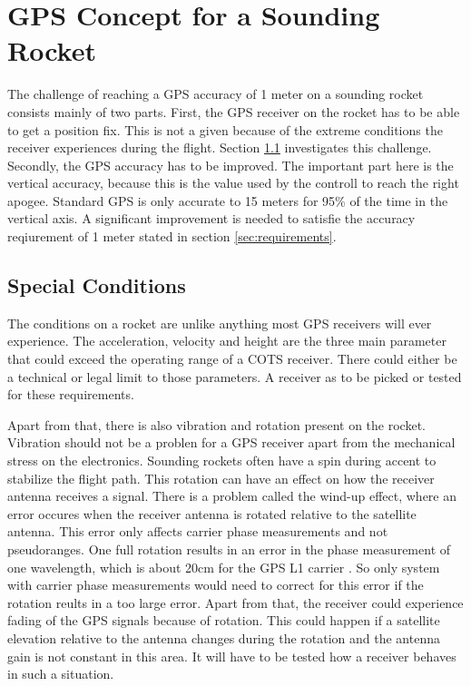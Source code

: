 \chapter{GPS Concept for a Sounding Rocket}

The challenge of reaching a GPS accuracy of 1 meter on a sounding rocket consists mainly of two parts.
First, the GPS receiver on the rocket has to be able to get a position fix.
This is not a given because of the extreme conditions the receiver experiences during the flight.
Section \ref{sec:special_conditions} investigates this challenge.
Secondly, the GPS accuracy has to be improved.
The important part here is the vertical accuracy, because this is the value used by the controll to reach the right apogee.
Standard GPS is only accurate to 15 meters for 95\% of the time in the vertical axis.
A significant improvement is needed to satisfie the accuracy reqiurement of 1 meter stated in section \ref{sec:requirements}.


\section{Special Conditions}\label{sec:special_conditions}

The conditions on a rocket are unlike anything most GPS receivers will ever experience.
The acceleration, velocity and height are the three main parameter that could exceed the operating range of a COTS receiver.
There could either be a technical or legal limit to those parameters.
A receiver as to be picked or tested for these requirements.

Apart from that, there is also vibration and rotation present on the rocket.
Vibration should not be a problen for a GPS receiver apart from the mechanical stress on the electronics.
Sounding rockets often have a spin during accent to stabilize the flight path.
This rotation can have an effect on how the receiver antenna receives a signal.
There is a problem called the wind-up effect, where an error occures when the receiver antenna is rotated relative to the satellite antenna.
This error only affects carrier phase measurements and not pseudoranges.
One full rotation results in an error in the phase measurement of one wavelength, which is about 20cm for the GPS L1 carrier \cite{Wind_up}. 
So only system with carrier phase measurements would need to correct for this error if the rotation reults in a too large error.
Apart from that, the receiver could experience fading of the GPS signals because of rotation.
This could happen if a satellite elevation relative to the antenna changes during the rotation and the antenna gain is not constant in this area.
It will have to be tested how a receiver behaves in such a situation.

